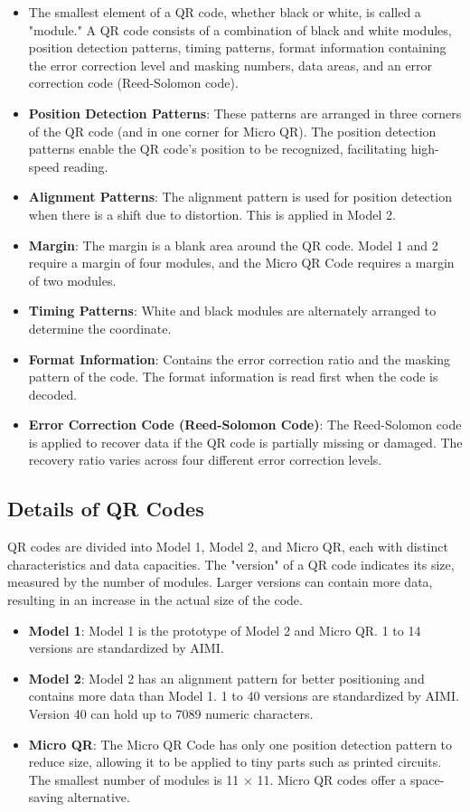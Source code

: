 \begin{itemize}
	\item The smallest element of a QR code, whether black or white, is called a "module." A QR code consists of a combination of black and white modules, position detection patterns, timing patterns, format information containing the error correction level and masking numbers, data areas, and an error correction code (Reed-Solomon code).
	\item \textbf{Position Detection Patterns}: These patterns are arranged in three corners of the QR code (and in one corner for Micro QR). The position detection patterns enable the QR code's position to be recognized, facilitating high-speed reading.
	\item \textbf{Alignment Patterns}: The alignment pattern is used for position detection when there is a shift due to distortion. This is applied in Model 2.
	\item \textbf{Margin}: The margin is a blank area around the QR code. Model 1 and 2 require a margin of four modules, and the Micro QR Code requires a margin of two modules.
	\item \textbf{Timing Patterns}: White and black modules are alternately arranged to determine the coordinate.
	\item \textbf{Format Information}: Contains the error correction ratio and the masking pattern of the code. The format information is read first when the code is decoded.
	\item \textbf{Error Correction Code (Reed-Solomon Code)}: The Reed-Solomon code is applied to recover data if the QR code is partially missing or damaged. The recovery ratio varies across four different error correction levels.
\end{itemize}

\subsection{Details of QR Codes}
QR codes are divided into Model 1, Model 2, and Micro QR, each with distinct characteristics and data capacities. The "version" of a QR code indicates its size, measured by the number of modules. Larger versions can contain more data, resulting in an increase in the actual size of the code.

\begin{itemize}
	\item \textbf{Model 1}: Model 1 is the prototype of Model 2 and Micro QR. 1 to 14 versions are standardized by AIMI.
	\item \textbf{Model 2}: Model 2 has an alignment pattern for better positioning and contains more data than Model 1. 1 to 40 versions are standardized by AIMI. Version 40 can hold up to 7089 numeric characters.
	\item \textbf{Micro QR}: The Micro QR Code has only one position detection pattern to reduce size, allowing it to be applied to tiny parts such as printed circuits. The smallest number of modules is 11 × 11. Micro QR codes offer a space-saving alternative.
\end{itemize}

